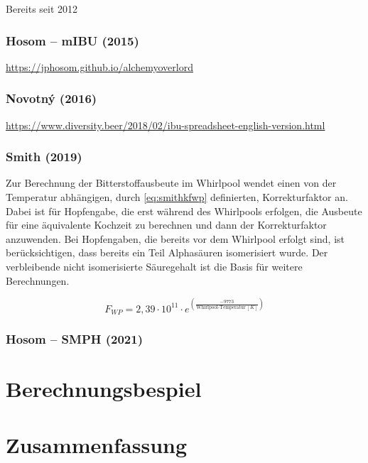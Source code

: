 \documentclass[a4paper,parskip=half]{scrartcl}
\begin{document}
Bereits seit 2012

\parencite{Wolf2022}

\subsubsection*{Hosom – mIBU (2015)}

\url{https://jphosom.github.io/alchemyoverlord}

\parencite{Hosom2015}

\subsubsection*{Novotný (2016)}

\url{https://www.diversity.beer/2018/02/ibu-spreadsheet-english-version.html}
\parencite{Novotny2016}
\parencite{Novotny2018}

\subsubsection*{Smith (2019)}

Zur Berechnung der Bitterstoffausbeute im Whirlpool wendet \citeauthor{Smith2019}
einen von der Temperatur abhängigen, durch \autoref{eq:smithkfwp} definierten,
Korrekturfaktor an. Dabei ist für Hopfengabe, die erst während des Whirlpools
erfolgen, die Ausbeute für eine äquivalente Kochzeit zu berechnen und dann der
Korrekturfaktor anzuwenden. Bei Hopfengaben, die bereits vor dem Whirlpool erfolgt
sind, ist berücksichtigen, dass bereits ein Teil Alphasäuren isomerisiert wurde.
Der verbleibende nicht isomerisierte Säuregehalt ist die Basis für weitere
Berechnungen. \parencite{Smith2019}

\begin{equation}
\mathit{F}_{\mathit{WP}} = 2,39 \cdot 10^{11} \cdot e^{\left(\frac{-9773}{\text{Whirlpool-Temperatur}\:[K]} \right)}
\label{eq:smithkfwp}
\end{equation}

\subsubsection*{Hosom – SMPH (2021)}

\parencite{Hosom2021}

\section*{Berechnungsbespiel}

\section*{Zusammenfassung}

\parencite{Janish2019}
\parencite{Hieronymus2012}
\parencite{Nottebohm2020}
\parencite{Pyle1995}
\parencite{Justus2018}
\parencite{Parkin2017}
\parencite{Bishop1964}
\parencite{Nickerson1979}
\parencite{Calado2019}
\parencite{Weiss2019}

\parencite{Bruecklmeier2017}
\parencite{Bruecklmeier2018}


\printbibliography[title=Quellen]
\end{document}

